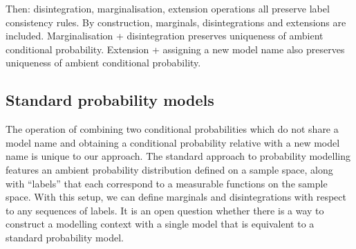 Then: disintegration, marginalisation, extension operations all preserve label consistency rules. By construction, marginals, disintegrations and extensions are included. Marginalisation + disintegration preserves uniqueness of ambient conditional probability. Extension + assigning a new model name also preserves uniqueness of ambient conditional probability.

\subsection{Standard probability models}

The operation of combining two conditional probabilities which do not share a model name and obtaining a conditional probability relative with a new model name is unique to our approach. The standard approach to probability modelling features an ambient probability distribution defined on a sample space, along with ``labels'' that each correspond to a measurable functions on the sample space. With this setup, we can define marginals and disintegrations with respect to any sequences of labels. It is an open question whether there is a way to construct a modelling context with a single model that is equivalent to a standard probability model.